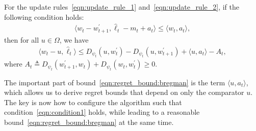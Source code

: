 \documentclass[final, 12pt]{colt2018} %
\newcommand{\p}{\prime}
\newcommand{\inn}[1]{ \langle {#1} \rangle }
\begin{document}
\begin{lemma}
\label{thm:general_instantaneous}
For the update rules~\eqref{eqn:update_rule_1} and~\eqref{eqn:update_rule_2}, if the following condition holds:
\begin{align}
\inn{w_t-w^\p_{t+1}, \hat{\ell}_t-m_t+a_t} \leq \inn{w_t, a_t}, \label{eqn:condition1} 
\end{align}
then for all $u\in \Omega$, we have
\begin{align}
\inn{w_t-u, \hat{\ell}_t}\leq D_{\psi_t}(u,w_t^\p)-D_{\psi_t}(u,w^\p_{t+1})+\inn{u,a_t}-A_t,\label{eqn:regret_bound:bregman}
\end{align}
where $A_t\triangleq D_{\psi_t}(w_{t+1}^\p, w_t)+D_{\psi_t}(w_t, w_t^\p)\geq 0$.
\end{lemma}
 




The important part of bound~\eqref{eqn:regret_bound:bregman} is the term $\inn{u,a_t}$, 
which allows us to derive regret bounds that depend on only the comparator $u$.
The key is now how to configure the algorithm such that condition~\eqref{eqn:condition1} holds, 
while leading to a reasonable bound~\eqref{eqn:regret_bound:bregman} at the same time. 
\end{document}
